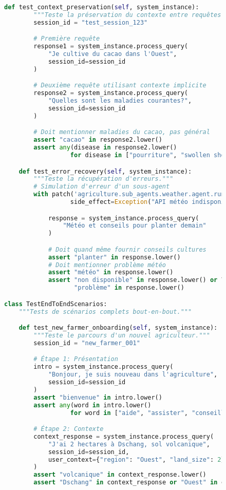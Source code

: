 \begin{figure}[h]
\begin{lstlisting}[language=Python, caption=Suite de tests d'intégration]
    def test_context_preservation(self, system_instance):
        """Teste la préservation du contexte entre requêtes."""
        session_id = "test_session_123"

        # Première requête
        response1 = system_instance.process_query(
            "Je cultive du cacao dans l'Ouest",
            session_id=session_id
        )

        # Deuxième requête utilisant contexte implicite
        response2 = system_instance.process_query(
            "Quelles sont les maladies courantes?",
            session_id=session_id
        )

        # Doit mentionner maladies du cacao, pas général
        assert "cacao" in response2.lower()
        assert any(disease in response2.lower()
                  for disease in ["pourriture", "swollen shoot"])

    def test_error_recovery(self, system_instance):
        """Teste la récupération d'erreurs."""
        # Simulation d'erreur d'un sous-agent
        with patch('agriculture.sub_agents.weather.agent.run',
                  side_effect=Exception("API météo indisponible")):

            response = system_instance.process_query(
                "Météo et conseils pour planter demain"
            )

            # Doit quand même fournir conseils cultures
            assert "planter" in response.lower()
            # Doit mentionner problème météo
            assert "météo" in response.lower()
            assert "non disponible" in response.lower() or \
                   "problème" in response.lower()

class TestEndToEndScenarios:
    """Tests de scénarios complets bout-en-bout."""

    def test_new_farmer_onboarding(self, system_instance):
        """Teste le parcours d'un nouvel agriculteur."""
        session_id = "new_farmer_001"

        # Étape 1: Présentation
        intro = system_instance.process_query(
            "Bonjour, je suis nouveau dans l'agriculture",
            session_id=session_id
        )
        assert "bienvenue" in intro.lower()
        assert any(word in intro.lower()
                  for word in ["aide", "assister", "conseiller"])

        # Étape 2: Contexte
        context_response = system_instance.process_query(
            "J'ai 2 hectares à Dschang, sol volcanique",
            session_id=session_id,
            user_context={"region": "Ouest", "land_size": 2}
        )
        assert "volcanique" in context_response.lower()
        assert "Dschang" in context_response or "Ouest" in context_response


\end{lstlisting}
\end{figure}
